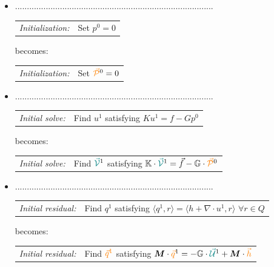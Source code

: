 \begin{itemize}
\item ....................................................................................
\begin{algobox}{}
\begin{tabular}{@{}r@{\quad}l@{}}
\textit{Initialization:} & Set $p^0 = 0$ 
\end{tabular} 
\end{algobox}
becomes:
\begin{algobox}{}
\begin{tabular}{@{}r@{\quad}l@{}}
\textit{Initialization:} & Set ${\color{orange}\vec{\cal P}}^0 = 0$ 
\end{tabular} 
\end{algobox}
\item ....................................................................................
\begin{algobox}{}
\begin{tabular}{@{}r@{\quad}l@{}}
\textit{Initial solve:} & Find $u^1$ satisfying $K u^1 = f - G p^0$ 
\end{tabular} 
\end{algobox}
becomes:
\begin{algobox}{}
\begin{tabular}{@{}r@{\quad}l@{}}
\textit{Initial solve:} & Find ${\color{teal}\vec{\cal V}}^1$ satisfying ${\mathbb{K}} \cdot {\color{teal}\vec{\cal V}}^1 = \vec{f} - {\mathbb{G}} \cdot  {\color{orange} \vec{\cal P}}^0$ 
\end{tabular} 
\end{algobox}

\item ....................................................................................
\begin{algobox}{}
\begin{tabular}{@{}r@{\quad}l@{}}
\textit{Initial residual:} & Find $q^1$ satisfying $\langle q^1, r \rangle = \langle h + \nabla\!\cdot u^1, r \rangle$ \; $\forall r \in Q$ 
\end{tabular} 
\end{algobox}
becomes:
\begin{algobox}{}
\begin{tabular}{@{}r@{\quad}l@{}}
\textit{Initial residual:} & Find ${\color{orange}\vec{q}^1}$ satisfying ${\bm M} \cdot {\color{orange}\vec{q}}^1
= -{\mathbb{G}} \cdot {\color{teal}\vec{\cal U}}^1 + {\bm M} \cdot {\color{orange}\vec{h}} $ 
\end{tabular} 
\end{algobox}




\end{itemize}
